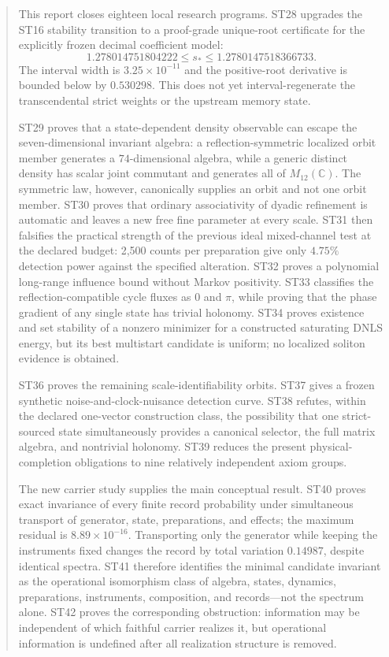 \documentclass[11pt,a4paper]{article}
\begin{document}
\begin{abstract}
This report closes eighteen local research programs. ST28 upgrades the ST16 stability transition to a proof-grade unique-root certificate for the explicitly frozen decimal coefficient model:
\[
1.278014751804222\le s_*\le1.2780147518366733.
\]
The interval width is $3.25\times10^{-11}$ and the positive-root derivative is bounded below by $0.530298$. This does not yet interval-regenerate the transcendental strict weights or the upstream memory state.

ST29 proves that a state-dependent density observable can escape the seven-dimensional invariant algebra: a reflection-symmetric localized orbit member generates a $74$-dimensional algebra, while a generic distinct density has scalar joint commutant and generates all of $M_{12}(\mathbb C)$. The symmetric law, however, canonically supplies an orbit and not one orbit member. ST30 proves that ordinary associativity of dyadic refinement is automatic and leaves a new free fine parameter at every scale. ST31 then falsifies the practical strength of the previous ideal mixed-channel test at the declared budget: 2,500 counts per preparation give only $4.75\%$ detection power against the specified alteration. ST32 proves a polynomial long-range influence bound without Markov positivity. ST33 classifies the reflection-compatible cycle fluxes as $0$ and $\pi$, while proving that the phase gradient of any single state has trivial holonomy. ST34 proves existence and set stability of a nonzero minimizer for a constructed saturating DNLS energy, but its best multistart candidate is uniform; no localized soliton evidence is obtained.

ST36 proves the remaining scale-identifiability orbits. ST37 gives a frozen synthetic noise-and-clock-nuisance detection curve. ST38 refutes, within the declared one-vector construction class, the possibility that one strict-sourced state simultaneously provides a canonical selector, the full matrix algebra, and nontrivial holonomy. ST39 reduces the present physical-completion obligations to nine relatively independent axiom groups.

The new carrier study supplies the main conceptual result. ST40 proves exact invariance of every finite record probability under simultaneous transport of generator, state, preparations, and effects; the maximum residual is $8.89\times10^{-16}$. Transporting only the generator while keeping the instruments fixed changes the record by total variation $0.14987$, despite identical spectra. ST41 therefore identifies the minimal candidate invariant as the operational isomorphism class of algebra, states, dynamics, preparations, instruments, composition, and records---not the spectrum alone. ST42 proves the corresponding obstruction: information may be independent of which faithful carrier realizes it, but operational information is undefined after all realization structure is removed.


\end{abstract}
\end{document}
